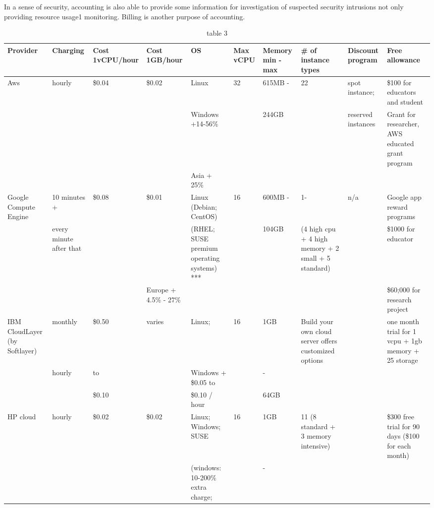 \documentclass{sig-alternate}
\begin{document}
In a sense of security, accounting is also able to provide some information for investigation of suspected security intrusions not only providing resource usage1 monitoring. Billing is another purpose of accounting.



\begin{table}
\caption{table 3}\label{T:tab3}

\begin{small}
\begin{tabular}{|p{2cm}|p{2cm}|p{1.5cm}|p{1.5cm}|p{2cm}|p{1cm}|p{1.5cm}|p{2cm}|p{2cm}|p{2cm}|}
\hline
Provider & Charging & Cost 1vCPU/hour	   & Cost 1GB/hour & OS & Max vCPU & Memory min - max &\# of instance types & Discount program & Free allowance\\
\hline
\hline
Aws & hourly & \$0.04  & \$0.02  & Linux & 32 & 615MB - & 22 & spot instance;  & \$100 for educators and student\\
    &  	     &         &  	 & Windows +14-56\%   	&    & 244GB    &       & reserved instances & Grant for researcher, AWS educated grant program\\
    &  	     &         &  	 & Asia + 25\% 		&    & 		       &       &  	  	    & \\
\hline
Google Compute Engine & 10 minutes + & \$0.08  & \$0.01  & Linux (Debian; CentOS) & 16 & 600MB - & 1- & n/a & Google app reward programs\\
 & every minute after that &  &  & (RHEL; SUSE premium operating systems) *** &  & 104GB & (4 high cpu + 4 high memory + 2 small + 5 standard) &  & \$1000 for educator\\
 &  &  & Europe + 4.5\% - 27\%  &  &  &  &  &  & \$60;000 for research project\\
\hline 
IBM CloudLayer (by Softlayer) & monthly & \$0.50  & varies & Linux;  & 16 & 1GB  & Build your own cloud server offers customized options &  & one month trial for 1 vcpu + 1gb memory + 25 storage\\
\hline
 & hourly & to &  & Windows + \$0.05 to &  & -  &  &  & \\
 &  & \$0.10  &  &               \$0.10 / hour &  & 64GB &  &  & \\
\hline 
HP cloud & hourly & \$0.02  & \$0.02  & Linux; Windows; SUSE & 16 & 1GB  & 11 (8 standard + 3 memory intensive) &  & \$300 free trial for 90 days (\$100 for each month)\\
 &  &  &  & (windows: 10-200\% extra charge; &  & -  &  &  & \\

\end{tabular}
\end{small}
\end{table}
\end{document}
